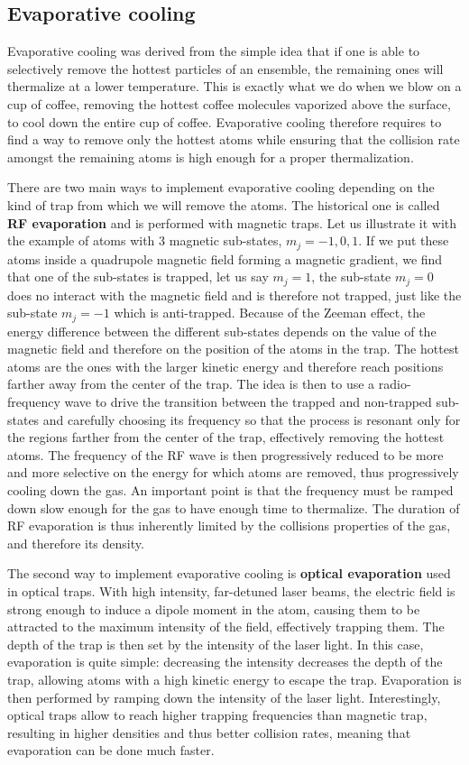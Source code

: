 \subsection{Evaporative cooling}

Evaporative cooling was derived from the simple idea that if one is able to selectively remove the hottest particles of an ensemble, the remaining ones will thermalize at a lower temperature. This is exactly what we do when we blow on a cup of coffee, removing the hottest coffee molecules vaporized above the surface, to cool down the entire cup of coffee. Evaporative cooling therefore requires to find a way to remove only the hottest atoms while ensuring that the collision rate amongst the remaining atoms is high enough for a proper thermalization. 

There are two main ways to implement evaporative cooling depending on the kind of trap from which we will remove the atoms. The historical one is called \textbf{RF evaporation} and is performed with magnetic traps. Let us illustrate it with the example of atoms with 3 magnetic sub-states, $m_j={-1,0,1}$. If we put these atoms inside a quadrupole magnetic field forming a magnetic gradient, we find that one of the sub-states is trapped, let us say $m_j=1$, the sub-state $m_j=0$ does no interact with the magnetic field and is therefore not trapped, just like the sub-state $m_j=-1$ which is anti-trapped. Because of the Zeeman effect, the energy difference between the different sub-states depends on the value of the magnetic field and therefore on the position of the atoms in the trap. The hottest atoms are the ones with the larger kinetic energy and therefore reach positions farther away from the center of the trap. The idea is then to use a radio-frequency wave to drive the transition between the trapped and non-trapped sub-states and carefully choosing its frequency so that the process is resonant only for the regions farther from the center of the trap, effectively removing the hottest atoms. The frequency of the RF wave is then progressively reduced to be more and more selective on the energy for which atoms are removed, thus progressively cooling down the gas. An important point is that the frequency must be ramped down slow enough for the gas to have enough time to thermalize. The duration of RF evaporation is thus inherently limited by the collisions properties of the gas, and therefore its density.

The second way to implement evaporative cooling is \textbf{optical evaporation} used in optical traps. With high intensity, far-detuned laser beams, the electric field is strong enough to induce a dipole moment in the atom, causing them to be attracted to the maximum intensity of the field, effectively trapping them. The depth of the trap is then set by the intensity of the laser light. In this case, evaporation is quite simple: decreasing the intensity decreases the depth of the trap, allowing atoms with a high kinetic energy to escape the trap. Evaporation is then performed by ramping down the intensity of the laser light. Interestingly, optical traps allow to reach higher trapping frequencies than magnetic trap, resulting in higher densities and thus better collision rates, meaning that evaporation can be done much faster.

